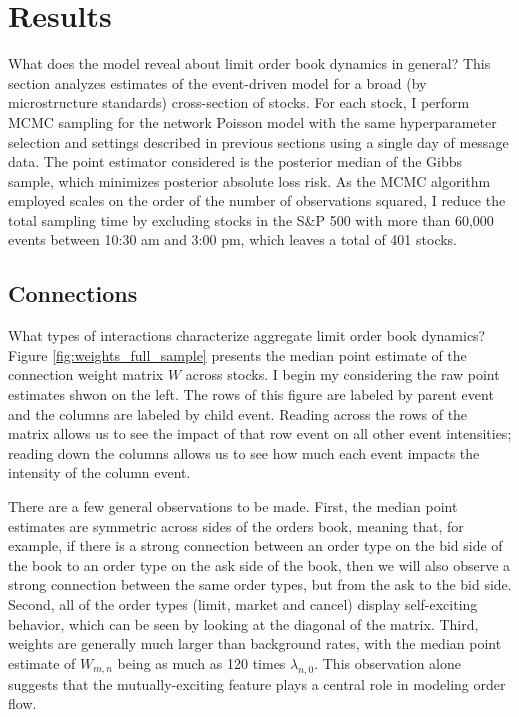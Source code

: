 \section{Results}
	What does the model reveal about limit order book dynamics in general? This section analyzes estimates of the event-driven model for a broad (by microstructure standards) cross-section of stocks. For each stock, I perform MCMC sampling for the network Poisson model with the same hyperparameter selection and settings described in previous sections using a single day of message data. The point estimator considered is the posterior median of the Gibbs sample, which minimizes posterior absolute loss risk. As the MCMC algorithm employed scales on the order of the number of observations squared, I reduce the total sampling time by excluding stocks in the S\&P 500 with more than 60,000 events between 10:30 am and 3:00 pm, which leaves a total of 401 stocks.

	\subsection{Connections}
		What types of interactions characterize aggregate limit order book dynamics? Figure \ref{fig:weights_full_sample} presents the median point estimate of the connection weight matrix $W$ across stocks. I begin my considering the raw point estimates shwon on the left. The rows of this figure are labeled by parent event and the columns are labeled by child event. Reading across the rows of the matrix allows us to see the impact of that row event on all other event intensities; reading down the columns allows us to see how much each event impacts the intensity of the column event.

		There are a few general observations to be made. First, the median point estimates are symmetric across sides of the orders book, meaning that, for example, if there is a strong connection between an order type on the bid side of the book to an order type on the ask side of the book, then we will also observe a strong connection between the same order types, but from the ask to the bid side. Second, all of the order types (limit, market and cancel) display self-exciting behavior, which can be seen by looking at the diagonal of the matrix. Third, weights are generally much larger than background rates, with the median point estimate of $W_{m,n}$ being as much as 120 times $\lambda_{n,0}$. This observation alone suggests that the mutually-exciting feature plays a central role in modeling order flow.

